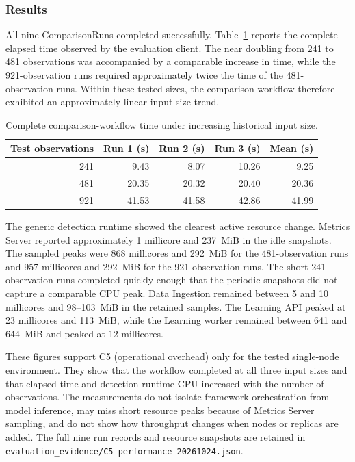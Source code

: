 \subsubsection{Results}

All nine ComparisonRuns completed successfully. Table~\ref{tab:h9-input-scaling-results} reports the complete elapsed time observed by the evaluation client. The near doubling from 241 to 481 observations was accompanied by a comparable increase in time, while the 921-observation runs required approximately twice the time of the 481-observation runs. Within these tested sizes, the comparison workflow therefore exhibited an approximately linear input-size trend.

\begin{table}[H]
    \centering
    \small
    \caption{Complete comparison-workflow time under increasing historical input size.}
    \label{tab:h9-input-scaling-results}
    \begin{tabular}{|r|r|r|r|r|}
        \hline
        Test observations & Run 1 (s) & Run 2 (s) & Run 3 (s) & Mean (s) \\
        \hline
        241 & 9.43 & 8.07 & 10.26 & 9.25 \\
        481 & 20.35 & 20.32 & 20.40 & 20.36 \\
        921 & 41.53 & 41.58 & 42.86 & 41.99 \\
        \hline
    \end{tabular}
\end{table}

The generic detection runtime showed the clearest active resource change. Metrics Server reported approximately 1 millicore and 237~MiB in the idle snapshots. The sampled peaks were 868 millicores and 292~MiB for the 481-observation runs and 957 millicores and 292~MiB for the 921-observation runs. The short 241-observation runs completed quickly enough that the periodic snapshots did not capture a comparable CPU peak. Data Ingestion remained between 5 and 10 millicores and 98--103~MiB in the retained samples. The Learning API peaked at 23 millicores and 113~MiB, while the Learning worker remained between 641 and 644~MiB and peaked at 12 millicores.

These figures support C5 (operational overhead) only for the tested single-node environment. They show that the workflow completed at all three input sizes and that elapsed time and detection-runtime CPU increased with the number of observations. The measurements do not isolate framework orchestration from model inference, may miss short resource peaks because of Metrics Server sampling, and do not show how throughput changes when nodes or replicas are added. The full nine run records and resource snapshots are retained in \texttt{evaluation\_evidence/C5-performance-20261024.json}.

